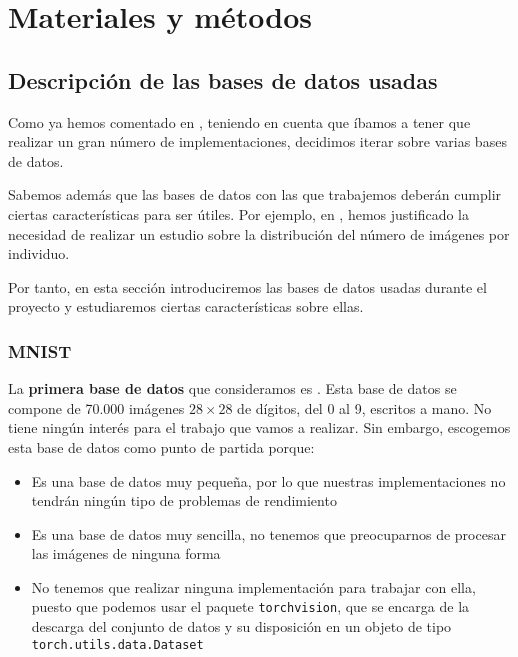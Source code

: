\chapter{Materiales y métodos} \label{ich:materiales_metodos}

\section{Descripción de las bases de datos usadas} \label{isec:base_datos_usada}

Como ya hemos comentado en , teniendo en cuenta que íbamos a tener que realizar un gran número de implementaciones, decidimos iterar sobre varias bases de datos.

Sabemos además que las bases de datos con las que trabajemos deberán cumplir ciertas características para ser útiles. Por ejemplo, en , hemos justificado la necesidad de realizar un estudio sobre la distribución del número de imágenes por individuo.

Por tanto, en esta sección introduciremos las bases de datos usadas durante el proyecto y estudiaremos ciertas características sobre ellas.

\subsection{MNIST}

La \textbf{primera base de datos} que consideramos es  \cite{informatica:mnist}. Esta base de datos se compone de 70.000 imágenes $28 \times 28$ de dígitos, del 0 al 9, escritos a mano. No tiene ningún interés para el trabajo que vamos a realizar. Sin embargo, escogemos esta base de datos como punto de partida porque:

\begin{itemize}
    \item Es una base de datos muy pequeña, por lo que nuestras implementaciones no tendrán ningún tipo de problemas de rendimiento
    \item Es una base de datos muy sencilla, no tenemos que preocuparnos de procesar las imágenes de ninguna forma
    \item No tenemos que realizar ninguna implementación para trabajar con ella, puesto que podemos usar el paquete \lstinline{torchvision}, que se encarga de la descarga del conjunto de datos y su disposición en un objeto de tipo \lstinline{torch.utils.data.Dataset}
\end{itemize}

